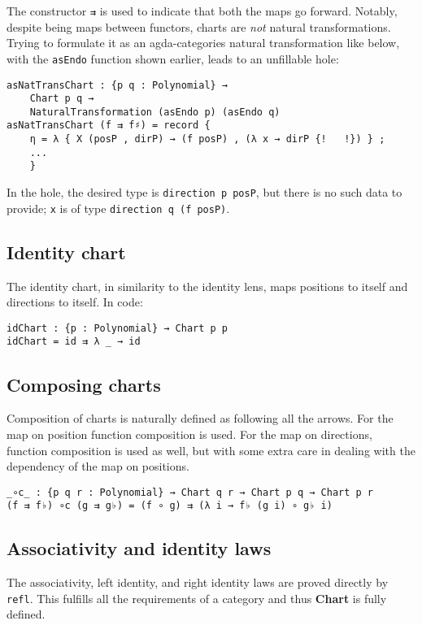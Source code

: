 The constructor \texttt{⇉} is used to indicate that both the maps go forward. Notably, despite being maps between functors, charts are \textit{not} natural transformations. Trying to formulate it as an agda-categories natural transformation like below, with the \texttt{asEndo} function shown earlier, leads to an unfillable hole:

\begin{verbatim}
asNatTransChart : {p q : Polynomial} → 
    Chart p q → 
    NaturalTransformation (asEndo p) (asEndo q)
asNatTransChart (f ⇉ f♯) = record { 
    η = λ { X (posP , dirP) → (f posP) , (λ x → dirP {!   !}) } ; 
    ... 
    }
\end{verbatim}
In the hole, the desired type is \texttt{direction p posP}, but there is no such data to provide; \texttt{x} is of type \texttt{direction q (f posP)}.

\subsection{Identity chart}
The identity chart, in similarity to the identity lens, maps positions to itself and directions to itself. In code:

\begin{verbatim}
idChart : {p : Polynomial} → Chart p p
idChart = id ⇉ λ _ → id
\end{verbatim}

\subsection{Composing charts}
Composition of charts is naturally defined as following all the arrows. For the map on position function composition is used. For the map on directions, function composition is used as well, but with some extra care in dealing with the dependency of the map on positions. 
\begin{verbatim}
_∘c_ : {p q r : Polynomial} → Chart q r → Chart p q → Chart p r
(f ⇉ f♭) ∘c (g ⇉ g♭) = (f ∘ g) ⇉ (λ i → f♭ (g i) ∘ g♭ i)
\end{verbatim}

\subsection{Associativity and identity laws}
The associativity, left identity, and right identity laws are proved directly by \texttt{refl}. This fulfills all the requirements of a category and thus \textbf{Chart} is fully defined.


